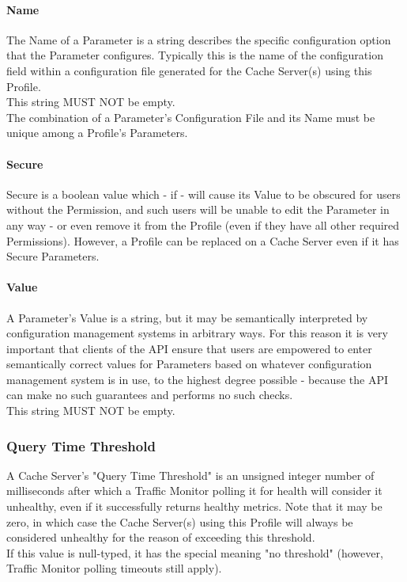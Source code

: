 \paragraph{Name}
The Name of a Parameter is a string describes the specific configuration option
that the Parameter configures. Typically this is the name of the configuration
field within a configuration file generated for the Cache Server(s) using this
Profile.\\
This string MUST NOT be empty.\\
The combination of a Parameter's Configuration File and its Name must be unique
among a Profile's Parameters.

\paragraph{Secure\label{sec:profile:param:secure}}
Secure is a boolean value which - if  - will cause its Value to be
obscured for users without the  Permission, and such
users will be unable to edit the Parameter in any way - or even remove it from
the Profile (even if they have all other required Permissions). However, a
Profile can be replaced on a Cache Server even if it has Secure Parameters.

\paragraph{Value}
A Parameter's Value is a string, but it may be semantically interpreted by
configuration management systems in arbitrary ways. For this reason it is very
important that clients of the API ensure that users are empowered to enter
semantically correct values for Parameters based on whatever configuration
management system is in use, to the highest degree possible - because the API
can make no such guarantees and performs no such checks.\\
This string MUST NOT be empty.

\subsubsection{Query Time Threshold}
A Cache Server's "Query Time Threshold" is an unsigned integer number of
milliseconds after which a Traffic Monitor polling it for health will consider
it unhealthy, even if it successfully returns healthy metrics. Note that it may
be zero, in which case the Cache Server(s) using this Profile will always be
considered unhealthy for the reason of exceeding this threshold.\\
If this value is null-typed, it has the special meaning "no threshold"
(however, Traffic Monitor polling timeouts still apply).

